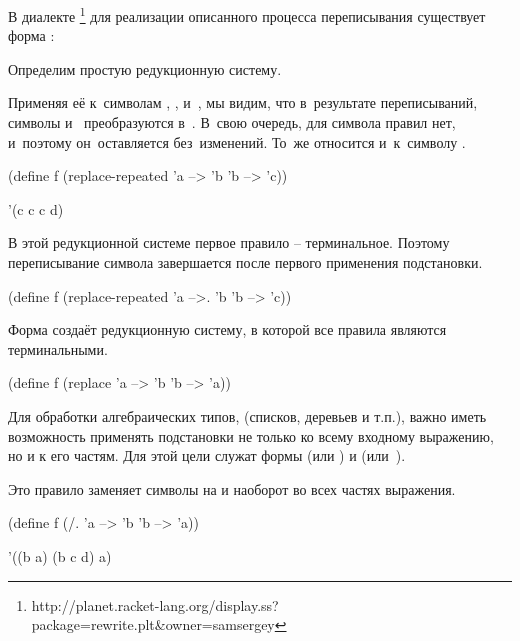 В диалекте \FLP\footnote{http://planet.racket-lang.org/display.ss?package=rewrite.plt\&owner=samsergey} для реализации описанного процесса переписывания существует форма :

\begin{example}{Определим простую редукционную систему.

Применяя её к~символам , ,  и~, мы видим, что в~результате переписываний, символы  и~ преобразуются в~. В~свою очередь, для символа  правил нет, и~поэтому он~оставляется без~изменений. То~же относится и~к~символу .
}
  \begin{ExampleCode}
(define f
  (replace-repeated
    'a --> 'b
    'b --> 'c))
  \end{ExampleCode}
       {'(c c c d)}
\end{example}
\begin{example}{В этой редукционной системе первое правило -- терминальное.
Поэтому переписывание символа  завершается после первого применения подстановки.}
  \begin{ExampleCode}
(define f
  (replace-repeated
    'a -->. 'b
    'b --> 'c))
  \end{ExampleCode}
\end{example}

\begin{example}{Форма  создаёт редукционную систему, в которой все правила являются терминальными.}
  \begin{ExampleCode}
(define f
  (replace
    'a --> 'b
    'b --> 'a))
  \end{ExampleCode}
\end{example}


Для обработки алгебраических типов, (списков, деревьев и т.п.), важно иметь возможность применять подстановки не только ко всему входному выражению, но и к его частям. Для этой цели служат формы  (или ) и  (или~).

\begin{example}{Это правило заменяет символы  на  и наоборот во всех частях выражения.}
  \begin{ExampleCode}
(define f
  (/. 'a --> 'b
      'b --> 'a))
  \end{ExampleCode}
       {'((b a) (b c d) a)}
\end{example}

